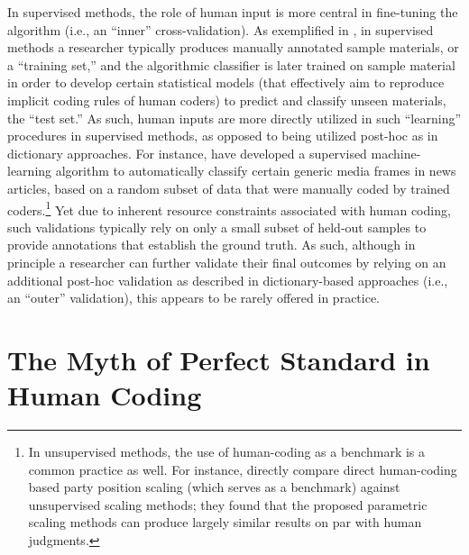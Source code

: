 \documentclass[man, floatsintext, 12pt, a4paper, noextraspace]{apa6}
\begin{document}
    In supervised methods, the role of human input is more central in fine-tuning the algorithm (i.e., an \enquote{inner} cross-validation). As exemplified in \textcite{scharkow2013thematic}, in supervised methods a researcher typically produces manually annotated sample materials, or a \enquote{training set,} and the algorithmic classifier is later trained on sample material in order to develop certain statistical models (that effectively aim to reproduce implicit coding rules of human coders) to predict and classify unseen materials, the \enquote{test set.} As such, human inputs are more directly utilized in such \enquote{learning} procedures in supervised methods, as opposed to being utilized post-hoc as in dictionary approaches. For instance, \textcite{burscher2014teaching} have developed a supervised machine-learning algorithm to automatically classify certain generic media frames in news articles, based on a random subset of data that were manually coded by trained coders.\footnote{ In unsupervised methods, the use of human-coding as a benchmark is a common practice as well. For instance, \textcite{lowe2013validating} directly compare direct human-coding based party position scaling (which serves as a benchmark) against unsupervised scaling methods; they found that the proposed parametric scaling methods can produce largely similar results on par with human judgments.} Yet due to inherent resource constraints associated with human coding, such validations typically rely on only a small subset of held-out samples to provide annotations that establish the ground truth. As such, although in principle a researcher can further validate their final outcomes by relying on an additional post-hoc validation as described in dictionary-based approaches (i.e., an \enquote{outer} validation), this appears to be rarely offered in practice.   
    
\section{The Myth of Perfect Standard in Human Coding}
\end{document}
